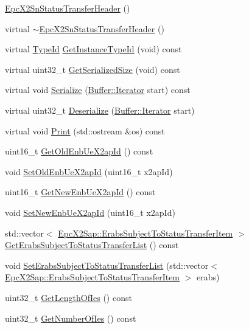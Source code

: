 \begin{DoxyCompactItemize}
\item 
\hyperlink{classns3_1_1EpcX2SnStatusTransferHeader_ac25ea3454ba063e1bca156de96265fb9}{Epc\+X2\+Sn\+Status\+Transfer\+Header} ()
\item 
virtual \hyperlink{classns3_1_1EpcX2SnStatusTransferHeader_a93e94c90a5213aa9b68c7ebc815c0800}{$\sim$\+Epc\+X2\+Sn\+Status\+Transfer\+Header} ()
\item 
virtual \hyperlink{classns3_1_1TypeId}{Type\+Id} \hyperlink{classns3_1_1EpcX2SnStatusTransferHeader_ad3f8d7c4c83a929d5dfc5ed218bc4d0c}{Get\+Instance\+Type\+Id} (void) const 
\item 
virtual uint32\+\_\+t \hyperlink{classns3_1_1EpcX2SnStatusTransferHeader_a5158d7c994f5e5e5adf5a8f4a28296f1}{Get\+Serialized\+Size} (void) const 
\item 
virtual void \hyperlink{classns3_1_1EpcX2SnStatusTransferHeader_a92ebb242513b3a8641273248dc19916d}{Serialize} (\hyperlink{classns3_1_1Buffer_1_1Iterator}{Buffer\+::\+Iterator} start) const 
\item 
virtual uint32\+\_\+t \hyperlink{classns3_1_1EpcX2SnStatusTransferHeader_a87cc0d726797ffc1264b65a5903ab668}{Deserialize} (\hyperlink{classns3_1_1Buffer_1_1Iterator}{Buffer\+::\+Iterator} start)
\item 
virtual void \hyperlink{classns3_1_1EpcX2SnStatusTransferHeader_a8758fb222ad3e3104ac9ee80ba0b715a}{Print} (std\+::ostream \&os) const 
\item 
uint16\+\_\+t \hyperlink{classns3_1_1EpcX2SnStatusTransferHeader_a901c07ffe6df187ab137253b10db0f3a}{Get\+Old\+Enb\+Ue\+X2ap\+Id} () const 
\item 
void \hyperlink{classns3_1_1EpcX2SnStatusTransferHeader_abfbc93ffb7e2a221b252df8453399b75}{Set\+Old\+Enb\+Ue\+X2ap\+Id} (uint16\+\_\+t x2ap\+Id)
\item 
uint16\+\_\+t \hyperlink{classns3_1_1EpcX2SnStatusTransferHeader_a1916903c57f4ffccc56e32eee5ffb0bb}{Get\+New\+Enb\+Ue\+X2ap\+Id} () const 
\item 
void \hyperlink{classns3_1_1EpcX2SnStatusTransferHeader_a928be1a348011df8e5ef02d79f7984f5}{Set\+New\+Enb\+Ue\+X2ap\+Id} (uint16\+\_\+t x2ap\+Id)
\item 
std\+::vector$<$ \hyperlink{structns3_1_1EpcX2Sap_1_1ErabsSubjectToStatusTransferItem}{Epc\+X2\+Sap\+::\+Erabs\+Subject\+To\+Status\+Transfer\+Item} $>$ \hyperlink{classns3_1_1EpcX2SnStatusTransferHeader_ad99812b54349303426b74f1dfb1503d4}{Get\+Erabs\+Subject\+To\+Status\+Transfer\+List} () const 
\item 
void \hyperlink{classns3_1_1EpcX2SnStatusTransferHeader_a5c695b0a1c6dceec290f7ed28ff33395}{Set\+Erabs\+Subject\+To\+Status\+Transfer\+List} (std\+::vector$<$ \hyperlink{structns3_1_1EpcX2Sap_1_1ErabsSubjectToStatusTransferItem}{Epc\+X2\+Sap\+::\+Erabs\+Subject\+To\+Status\+Transfer\+Item} $>$ erabs)
\item 
uint32\+\_\+t \hyperlink{classns3_1_1EpcX2SnStatusTransferHeader_aa6c0342eb9b7ca61bbbd3113ec7fd52b}{Get\+Length\+Of\+Ies} () const 
\item 
uint32\+\_\+t \hyperlink{classns3_1_1EpcX2SnStatusTransferHeader_aeb6c0370be7deed273deb4f1247ec0c5}{Get\+Number\+Of\+Ies} () const 
\end{DoxyCompactItemize}
